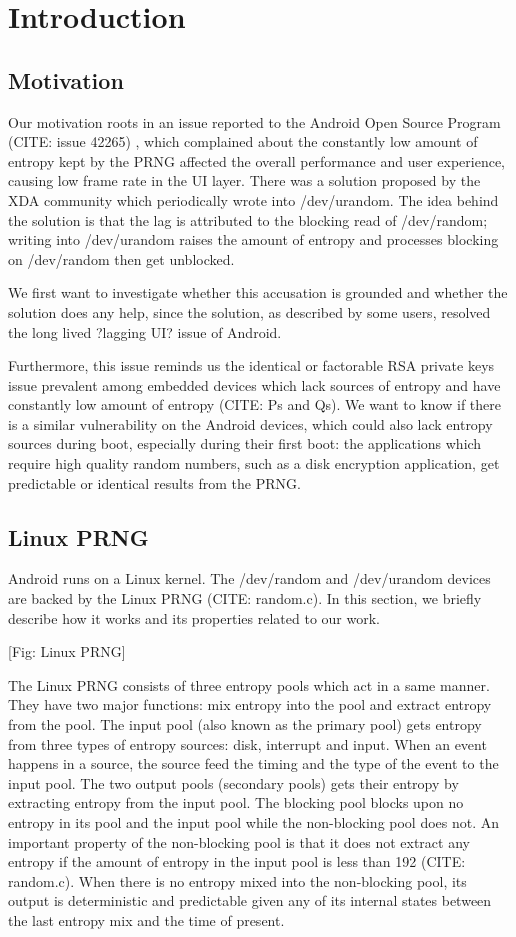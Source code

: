 \section{Introduction}
\subsection{Motivation}

Our motivation roots in an issue reported to the Android Open Source Program (CITE: issue 42265) , which complained about the constantly low amount of entropy kept by the PRNG affected the overall performance and user experience, causing low frame rate in the UI layer. There was a solution proposed by the XDA community which periodically wrote into /dev/urandom. The idea behind the solution is that the lag is attributed to the blocking read of /dev/random; writing into /dev/urandom raises the amount of entropy and processes blocking on /dev/random then get unblocked. 

We first want to investigate whether this accusation is grounded and whether the solution does any help, since the solution, as described by some users, resolved the long lived ?lagging UI? issue of Android.

Furthermore, this issue reminds us the identical or factorable RSA private keys issue prevalent among embedded devices which lack sources of entropy and have constantly low amount of entropy (CITE: Ps and Qs). We want to know if there is a similar vulnerability on the Android devices, which could also lack entropy sources during boot, especially during their first boot: the applications which require high quality random numbers, such as a disk encryption application,  get predictable or identical results from the PRNG.

\subsection{Linux PRNG}
Android runs on a Linux kernel. The /dev/random and /dev/urandom devices are backed by the Linux PRNG (CITE: random.c). In this section, we briefly describe how it works and its properties related to our work.

[Fig: Linux PRNG]

The Linux PRNG consists of three entropy pools which act in a same manner. They have two major functions: mix entropy into the pool and extract entropy from the pool. The input pool (also known as the primary pool) gets entropy from three types of entropy sources: disk, interrupt and input. When an event happens in a source, the source feed the timing and the type of the event to the input pool. The two output pools (secondary pools) gets their entropy by extracting entropy from the input pool. The blocking pool blocks upon no entropy in its pool and the input pool while the non-blocking pool does not. An important property of the non-blocking pool is that it does not extract any entropy if the amount of entropy in the input pool is less than 192 (CITE: random.c). When there is no entropy mixed into the non-blocking pool, its output is deterministic and predictable given any of its internal states between the last entropy mix and the time of present. 

